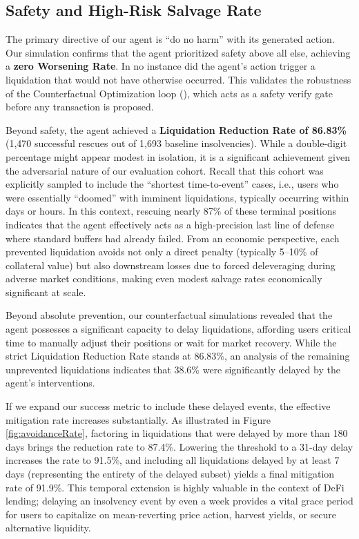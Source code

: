 \documentclass[manuscript,screen,review]{acmart}
\begin{document}
\subsection{Safety and High-Risk Salvage Rate}

The primary directive of our agent is ``do no harm'' with its generated action. Our simulation confirms that the agent prioritized safety above all else, achieving a \textbf{zero Worsening Rate}. In no instance did the agent's action trigger a liquidation that would not have otherwise occurred. This validates the robustness of the Counterfactual Optimization loop (), which acts as a safety verify gate before any transaction is proposed.

Beyond safety, the agent achieved a \textbf{Liquidation Reduction Rate of 86.83\%} (1,470 successful rescues out of 1,693 baseline insolvencies). While a double-digit percentage might appear modest in isolation, it is a significant achievement given the adversarial nature of our evaluation cohort. Recall that this cohort was explicitly sampled to include the ``shortest time-to-event'' cases, i.e., users who were essentially ``doomed'' with imminent liquidations, typically occurring within days or hours. In this context, rescuing nearly 87\% of these terminal positions indicates that the agent effectively acts as a high-precision last line of defense where standard buffers had already failed.
From an economic perspective, each prevented liquidation avoids not only a direct penalty (typically 5--10\% of collateral value) but also downstream losses due to forced deleveraging during adverse market conditions, making even modest salvage rates economically significant at scale.

Beyond absolute prevention, our counterfactual simulations revealed that the agent possesses a significant capacity to delay liquidations, affording users critical time to manually adjust their positions or wait for market recovery. While the strict Liquidation Reduction Rate stands at 86.83\%, an analysis of the remaining unprevented liquidations indicates that 38.6\% were significantly delayed by the agent's interventions. 

If we expand our success metric to include these delayed events, the effective mitigation rate increases substantially. As illustrated in Figure \ref{fig:avoidanceRate}, factoring in liquidations that were delayed by more than 180 days brings the reduction rate to 87.4\%. Lowering the threshold to a 31-day delay increases the rate to 91.5\%, and including all liquidations delayed by at least 7 days (representing the entirety of the delayed subset) yields a final mitigation rate of 91.9\%. This temporal extension is highly valuable in the context of DeFi lending; delaying an insolvency event by even a week provides a vital grace period for users to capitalize on mean-reverting price action, harvest yields, or secure alternative liquidity.
\end{document}
